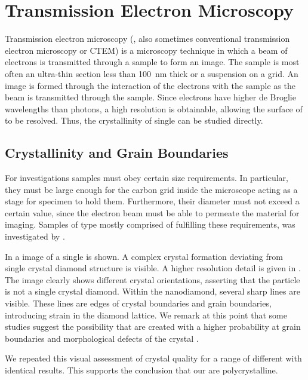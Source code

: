 		\section{Transmission Electron Microscopy}{\label{sec::tem}}

			Transmission electron microscopy (\TEM, also sometimes conventional transmission electron microscopy or CTEM) is a microscopy technique in which a beam of electrons is transmitted through a sample to form an image. The sample is most often an ultra-thin section less than \SI{100}{\nm} thick or a suspension on a grid. An image is formed through the interaction of the electrons with the sample as the beam is transmitted through the sample.
			Since electrons have higher de Broglie wavelengths than photons, a high resolution is obtainable, allowing the surface of \nds to be resolved. Thus, the crystallinity of single \nds can be studied directly.

			\subsection{Crystallinity and Grain Boundaries}\label{subsec::tem_crystal}

				For \TEM investigations \nd samples must obey certain size requirements.
				In particular, they must be large enough for the carbon grid inside the microscope acting as a stage for specimen to hold them.
				Furthermore, their diameter must not exceed a certain value, since the \TEM electron beam must be able to permeate the material for imaging.
				Samples of type \insituH mostly comprised of \nds fulfilling these requirements, was investigated by \schmauch.
				
				In  a \TEM image of a single \nd is shown. A complex crystal formation deviating from single crystal diamond structure is visible. A higher resolution detail is given in . The image clearly shows different crystal orientations, asserting that the \nd particle is not a single crystal diamond. Within the nanodiamond, several sharp lines are visible. These lines are edges of crystal boundaries and grain boundaries, introducing strain in the diamond lattice. We remark at this point that some studies suggest the possibility that \sivs are created with a higher probability at grain boundaries and morphological defects of the crystal \cite{bray2016localization, zapol2001tight}.
				
				We repeated this visual assessment of crystal quality for a range of different \nds with identical results. This supports the conclusion that our \nds are polycrystalline.

